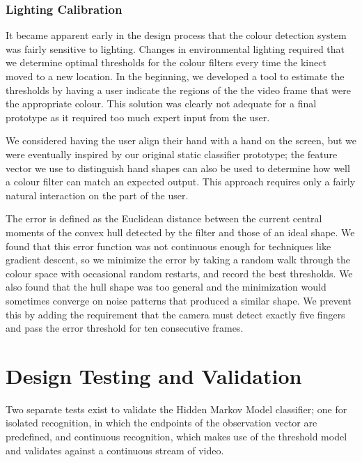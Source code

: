 \documentclass[12pt]{article}
\begin{document}
\subsubsection{Lighting Calibration}
It became apparent early in the design process that the colour detection system was fairly sensitive to lighting. Changes in environmental lighting required that we determine optimal thresholds for the colour filters every time the kinect moved to a new location. In the beginning, we developed a tool to estimate the thresholds by having a user indicate the regions of the the video frame that were the appropriate colour. This solution was clearly not adequate for a final prototype as it required too much expert input from the user.

We considered having the user align their hand with a hand on the screen, but we were eventually inspired by our original static classifier prototype; the feature vector we use to distinguish hand shapes can also be used to determine how well a colour filter can match an expected output. This approach requires only a fairly natural interaction on the part of the user.

The error is defined as the Euclidean distance between the current central moments of the convex hull detected by the filter and those of an ideal shape. We found that this error function was not continuous enough for techniques like gradient descent, so we minimize the error by taking a random walk through the colour space with occasional random restarts, and record the best thresholds. We also found that the hull shape was too general and the minimization would sometimes converge on noise patterns that produced a similar shape. We prevent this by adding the requirement that the camera must detect exactly five fingers and pass the error threshold for ten consecutive frames.

\newpage
\section{Design Testing and Validation}
Two separate tests exist to validate the Hidden Markov Model classifier; one for isolated recognition, in which the endpoints of the observation vector are predefined, and continuous recognition, which makes use of the threshold model and validates against a continuous stream of video. 
\end{document}
